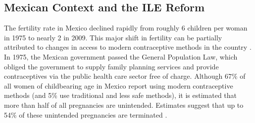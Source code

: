 \documentclass[a4paper, 11pt]{article}
\begin{document}
\begin{spacing}{2}


\section{Mexican Context and the ILE Reform}
\label{reform}
The fertility rate in Mexico declined rapidly from roughly 6 children per woman in 1975 to nearly 2 in 2009. This major shift in fertility can be partially attributed to changes in access to modern contraceptive methods in the country \citep{GIRE2009}.  In 1975, the Mexican government passed the General Population Law, which obliged the government to supply family planning services and provide contraceptives via the public health care sector free of charge. Although 67\% of all women of childbearing age in Mexico report using modern contraceptive methods (and 5\% use traditional and less safe methods), it is estimated that more than half of all pregnancies are unintended. Estimates suggest that up to 54\% of these unintended pregnancies are terminated \citep{GIRE2009}.


\end{spacing}
\end{document}
